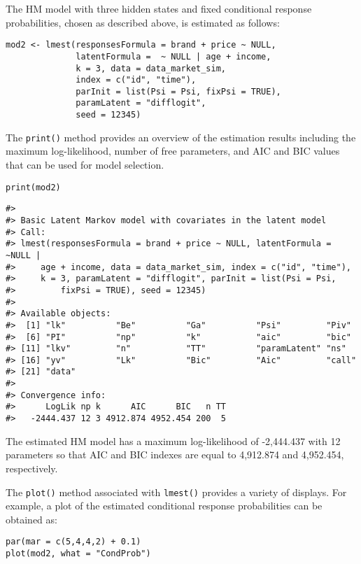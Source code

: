 The HM model with three hidden states and fixed conditional response
probabilities, chosen as described above, is estimated as follows:

\begin{verbatim}
mod2 <- lmest(responsesFormula = brand + price ~ NULL,
              latentFormula =  ~ NULL | age + income,
              k = 3, data = data_market_sim,
              index = c("id", "time"),
              parInit = list(Psi = Psi, fixPsi = TRUE),
              paramLatent = "difflogit",
              seed = 12345)
\end{verbatim}

The \texttt{print()} method provides an overview of the estimation results
including the maximum log-likelihood, number of free parameters, and AIC
and BIC values that can be used for model selection.

\begin{verbatim}
print(mod2)
\end{verbatim}

\begin{verbatim}
#> 
#> Basic Latent Markov model with covariates in the latent model
#> Call:
#> lmest(responsesFormula = brand + price ~ NULL, latentFormula = ~NULL | 
#>     age + income, data = data_market_sim, index = c("id", "time"), 
#>     k = 3, paramLatent = "difflogit", parInit = list(Psi = Psi, 
#>         fixPsi = TRUE), seed = 12345)
#> 
#> Available objects:
#>  [1] "lk"          "Be"          "Ga"          "Psi"         "Piv"        
#>  [6] "PI"          "np"          "k"           "aic"         "bic"        
#> [11] "lkv"         "n"           "TT"          "paramLatent" "ns"         
#> [16] "yv"          "Lk"          "Bic"         "Aic"         "call"       
#> [21] "data"       
#> 
#> Convergence info:
#>      LogLik np k      AIC      BIC   n TT
#>   -2444.437 12 3 4912.874 4952.454 200  5
\end{verbatim}

The estimated HM model has a maximum log-likelihood of -2,444.437 with
12 parameters so that AIC and BIC indexes are equal to 4,912.874 and
4,952.454, respectively.

The \texttt{plot()} method associated with \texttt{lmest()} provides a variety of
displays. For example, a plot of the estimated conditional response
probabilities can be obtained as:

\begin{verbatim}
par(mar = c(5,4,4,2) + 0.1)
plot(mod2, what = "CondProb")
\end{verbatim}

